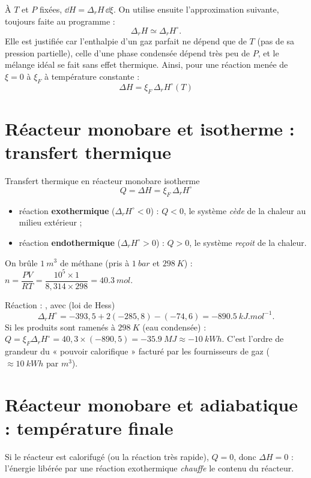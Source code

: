 À $T$ et $P$ fixées, $\dd H = \Delta_rH\,\dd\xi$. On utilise ensuite l'approximation suivante, toujours faite au programme :
\[ \Delta_rH \simeq \Delta_rH^\circ. \]
Elle est justifiée car l'enthalpie d'un gaz parfait ne dépend que de $T$ (pas de sa pression partielle), celle d'une phase condensée dépend très peu de $P$, et le mélange idéal se fait sans effet thermique. Ainsi, pour une réaction menée de $\xi = 0$ à $\xi_F$ à température constante :
\[ \boxed{\Delta H = \xi_F\,\Delta_rH^\circ(T)} \]

\section{Réacteur monobare et isotherme : transfert thermique}

\begin{resultat}{Transfert thermique en réacteur monobare isotherme}
\[ \boxed{Q = \Delta H = \xi_F\,\Delta_rH^\circ} \]
\begin{itemize}
  \item réaction \textbf{exothermique} ($\Delta_rH^\circ<0$) : $Q<0$, le système \emph{cède} de la chaleur au milieu extérieur ;
  \item réaction \textbf{endothermique} ($\Delta_rH^\circ>0$) : $Q>0$, le système \emph{reçoit} de la chaleur.
\end{itemize}
\end{resultat}

\begin{exemple}
On brûle $\SI{1}{m^3}$ de méthane (pris à $\SI{1}{bar}$ et $\SI{298}{K}$) : $n = \dfrac{PV}{RT} = \dfrac{10^5\times1}{8{,}314\times298} = \SI{40,3}{mol}$.

\noindent Réaction : , avec (loi de Hess)
\[ \Delta_rH^\circ = -393{,}5 + 2(-285{,}8) - (-74{,}6) = \SI{-890,5}{kJ.mol^{-1}}. \]
Si les produits sont ramenés à $\SI{298}{K}$ (eau condensée) : $Q = \xi_F\Delta_rH^\circ = 40{,}3\times(-890{,}5) = \SI{-35,9}{MJ} \approx \SI{-10}{kWh}$. C'est l'ordre de grandeur du « pouvoir calorifique » facturé par les fournisseurs de gaz ($\approx\SI{10}{kWh}$ par $\si{m^3}$).
\end{exemple}

\section{Réacteur monobare et adiabatique : température finale}

Si le réacteur est calorifugé (ou la réaction très rapide), $Q = 0$, donc $\Delta H = 0$ : l'énergie libérée par une réaction exothermique \emph{chauffe} le contenu du réacteur.

